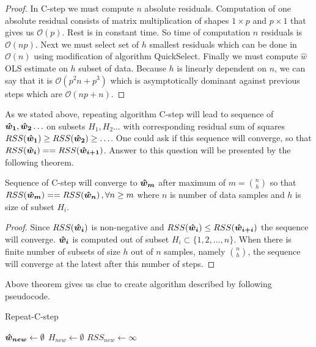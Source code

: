 \begin{proof}
	In C-step we must compute $n$ absolute residuals. Computation of one absolute residual consists of
	matrix multiplication of shapes $1 \times p$ and $p \times 1$ that gives us $\mathcal{O}(p)$. Rest is in constant time.
	So time of computation $n$ residuals is $\mathcal{O}(np)$.
	Next we must select set of $h$ smallest residuals which can be done in $\mathcal{O}(n)$ using modification of algorithm QuickSelect.  
	Finally we must compute $\hat{w}$ OLS estimate on $h$ subset of data.
	Because $h$ is linearly dependent on $n$, we can say that it is $\mathcal{O}(p^2n + p^3)$ which 
	is asymptotically dominant against previous steps which are $\mathcal{O}(np + n)$.
\end{proof}

As we stated above, repeating algorithm C-step will lead to sequence of $\boldsymbol{\hat{w}_1}, \boldsymbol{\hat{w}_2} \ldots$ 
on subsets $H_1, H_2 \ldots$ with corresponding residual sum of squares
$RSS(\boldsymbol{\hat{w}_{1}}) \geq RSS(\boldsymbol{\hat{w}_{2}}) \geq \ldots$. One could ask if this sequence will converge, so that
$RSS(\boldsymbol{\hat{w}_{i}}) == RSS(\boldsymbol{\hat{w}_{i+1}})$. 
Answer to this question will be presented by the following theorem.


\begin{theorem}
	Sequence of C-step will converge to $\boldsymbol{\hat{w}_{m}}$ after maximum of $m = {n \choose h}$
	so that $RSS(\boldsymbol{\hat{w}_{m}}) == RSS(\boldsymbol{\hat{w}_{n}})\,, \forall n\geq m$ where $n$ is number of data samples 
	and $h$ is size of subset $H_i$.
\end{theorem}

\begin{proof}
	Since  $RSS(\boldsymbol{\hat{w}_{i}})$ is non-negative and $RSS(\boldsymbol{\hat{w}_{i}}) \leq RSS(\boldsymbol{\hat{w}_{i+i}})$ the 
	sequence will converge. $\boldsymbol{\hat{w}_{i}}$  is computed out of subset 
	$H_i \subset \{{1,2,\ldots,n\}}$. When there is finite number of subsets of size $h$ out of $n$ samples, namely ${n \choose h}$, the sequence will converge at the latest after this number of steps.
\end{proof}

Above theorem gives us clue to create algorithm described by following pseudocode.

\begin{algorithm}[H]
	\label{alg:RepeatCstep}
	\caption{Repeat-C-step}
	$\boldsymbol{\hat{w}_{new}} \gets \emptyset$\;
	$H_{new} \gets \emptyset$\;
	$RSS_{new} \gets \infty $\;


	\;
\end{algorithm}

